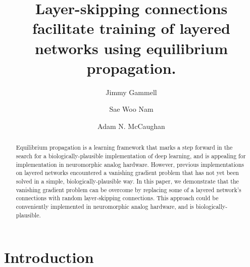 \documentclass[format=sigconf]{acmart}
\title{Layer-skipping connections facilitate training of layered networks using equilibrium propagation.}
\author{Jimmy Gammell}
\author{Sae Woo Nam}
\author{Adam N. McCaughan}
\begin{document}
\begin{abstract}

Equilibrium propagation is a learning framework that marks a step forward in the search for a biologically-plausible implementation of deep learning, and is appealing for implementation in neuromorphic analog hardware. However, previous implementations on layered networks encountered a vanishing gradient problem that has not yet been solved in a simple, biologically-plausible way. In this paper, we demonstrate that the vanishing gradient problem can be overcome by replacing some of a layered network's connections with random layer-skipping connections. This approach could be conveniently implemented in neuromorphic analog hardware, and is biologically-plausible.

\end{abstract}

\maketitle

\section{Introduction}
\end{document}
